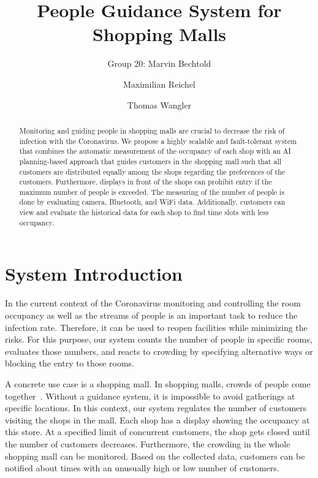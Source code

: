 \documentclass[runningheads]{llncs}
\begin{document}
%
\title{People Guidance System for Shopping Malls}

\author{Group 20: Marvin Bechtold \and
Maximilian Reichel \and
Thomas Wangler}

%
\maketitle              %
%
\begin{abstract}
Monitoring and guiding people in shopping malls are crucial to decrease the risk of infection with the Coronavirus. We propose a highly scalable and fault-tolerant system that combines the automatic measurement of the occupancy of each shop with an AI planning-based approach that guides customers in the shopping mall such that all customers are distributed equally among the shops regarding the preferences of the customers. Furthermore, displays in front of the shops can prohibit entry if the maximum number of people is exceeded. The measuring of the number of people is done by evaluating camera, Bluetooth, and WiFi data. Additionally, customers can view and evaluate the historical data for each shop to find time slots with less occupancy. 


\end{abstract}
%
%
%
\section{System Introduction}
In the current context of the Coronavirus monitoring and controlling the room occupancy as well as the streams of people is an important task to reduce the infection rate. Therefore, it can be used to reopen facilities while minimizing the risks. For this purpose, our system counts the number of people in specific rooms, evaluates those numbers, and reacts to crowding by specifying alternative ways or blocking the entry to those rooms.

A concrete use case is a shopping mall. In shopping malls, crowds of people come together~\cite{nguyenenabling}. Without a guidance system, it is impossible to avoid gatherings at specific locations. In this context, our system regulates the number of customers visiting the shops in the mall. Each shop has a display showing the occupancy at this store. At a specified limit of concurrent customers, the shop gets closed until the number of customers decreases. Furthermore, the crowding in the whole shopping mall can be monitored. Based on the collected data, customers can be notified about times with an unusually high or low number of customers. 
\end{document}
